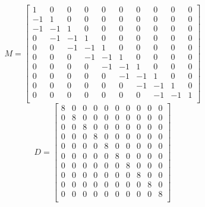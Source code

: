      $$M=\begin{bmatrix}
    1&0&0&0&0&0&0&0&0&0\\
    -1&1&0&0&0&0&0&0&0&0\\
    -1&-1&1&0&0&0&0&0&0&0\\
    0&-1&-1&1&0&0&0&0&0&0\\
    0&0&-1&-1&1&0&0&0&0&0\\
    0&0&0&-1&-1&1&0&0&0&0\\
    0&0&0&0&-1&-1&1&0&0&0\\
    0&0&0&0&0&-1&-1&1&0&0\\
    0&0&0&0&0&0&-1&-1&1&0\\
    0&0&0&0&0&0&0&-1&-1&1\\
    \end{bmatrix}$$
    $$D=\begin{bmatrix}
    8&0&0&0&0&0&0&0&0&0\\
    0&8&0&0&0&0&0&0&0&0\\
    0&0&8&0&0&0&0&0&0&0\\
    0&0&0&8&0&0&0&0&0&0\\
    0&0&0&0&8&0&0&0&0&0\\
    0&0&0&0&0&8&0&0&0&0\\
    0&0&0&0&0&0&8&0&0&0\\
    0&0&0&0&0&0&0&8&0&0\\
    0&0&0&0&0&0&0&0&8&0\\
    0&0&0&0&0&0&0&0&0&8\\
    \end{bmatrix}$$
    
